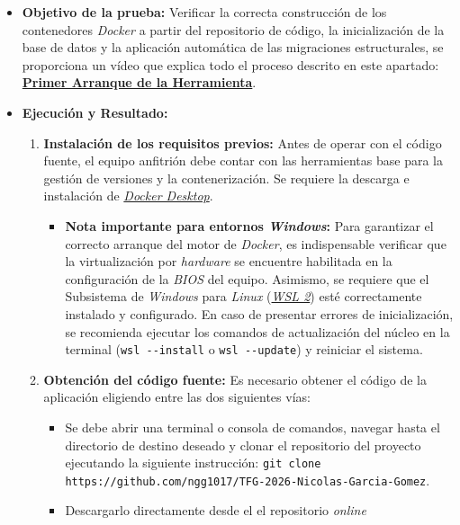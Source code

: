 \begin{itemize}
    \item \textbf{Objetivo de la prueba:} Verificar la correcta construcción de los contenedores \textit{Docker} a partir del repositorio de código, la inicialización de la base de datos y la aplicación automática de las migraciones estructurales, se proporciona un vídeo que explica todo el proceso descrito en este apartado: \textbf{\href{https://youtu.be/eCAgFDYIzCw}{Primer Arranque de la Herramienta}}.
    \item \textbf{Ejecución y Resultado:} 
    \begin{enumerate}
    		\item \textbf{Instalación de los requisitos previos:} Antes de operar con el código fuente, el equipo anfitrión debe contar con las herramientas base para la gestión de versiones y la contenerización. Se requiere la descarga e instalación de \href{https://www.docker.com/}{\textit{Docker Desktop}}.
    			\begin{itemize}
    				\item \textbf{Nota importante para entornos \textit{Windows}:} Para garantizar el correcto arranque del motor de \textit{Docker}, es indispensable verificar que la virtualización por \textit{hardware} se encuentre habilitada en la configuración de la \textit{BIOS} del equipo. Asimismo, se requiere que el Subsistema de \textit{Windows} para \textit{Linux} (\textit{\href{https://learn.microsoft.com/es-es/windows/wsl/install}{\textit{WSL 2}}}) esté correctamente instalado y configurado. En caso de presentar errores de inicialización, se recomienda ejecutar los comandos de actualización del núcleo en la terminal (\texttt{wsl -{}-install} o \texttt{wsl -{}-update}) y reiniciar el sistema.
    			\end{itemize}
        \item \textbf{Obtención del código fuente:} Es necesario obtener el código de la aplicación eligiendo entre las dos siguientes vías: 
        	\begin{itemize}
        		\item Se debe abrir una terminal o consola de comandos, navegar hasta el directorio de destino deseado y clonar el repositorio del proyecto ejecutando la siguiente instrucción: \texttt{git clone https://github.com/ngg1017/TFG-2026-Nicolas-Garcia-Gomez}.
        		
        		\item Descargarlo directamente desde el el repositorio \textit{online} \cite{github}
        	\end{itemize}
        	

\end{enumerate}
\end{itemize}
